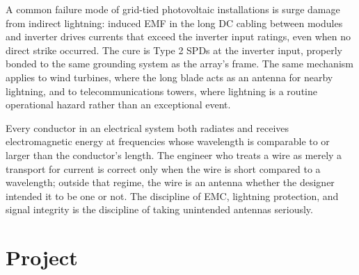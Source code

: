 A common failure mode of grid-tied photovoltaic installations is
surge damage from indirect lightning: induced EMF in the long DC
cabling between modules and inverter drives currents that exceed the
inverter input ratings, even when no direct strike occurred. The cure
is Type 2 SPDs at the inverter input, properly bonded to the same
grounding system as the array's frame. The same mechanism applies to
wind turbines, where the long blade acts as an antenna for nearby
lightning, and to telecommunications towers, where lightning is a
routine operational hazard rather than an exceptional event.

\begin{principle}
Every conductor in an electrical system both radiates and receives
electromagnetic energy at frequencies whose wavelength is comparable
to or larger than the conductor's length. The engineer who treats a
wire as merely a transport for current is correct only when the
wire is short compared to a wavelength; outside that regime, the wire
is an antenna whether the designer intended it to be one or not. The
discipline of EMC, lightning protection, and signal integrity is the
discipline of taking unintended antennas seriously.
\end{principle}

\section{Project}

